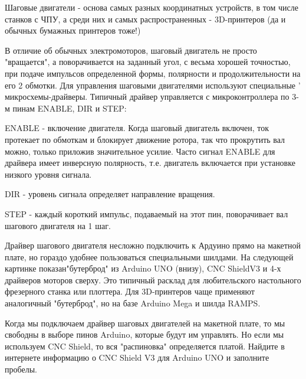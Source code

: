 Шаговые двигатели - основа самых разных координатных устройств, в том числе станков с ЧПУ, а среди них и самых распространенных - 3D-принтеров  (да и обычных бумажных принтеров тоже!)

В отличие об обычных электромоторов, шаговый двигатель не просто "вращается", а поворачивается на 
заданный угол, с весьма хорошей точностью, при подаче импульсов определенной формы, полярности и 
продолжительности на его 2 обмотки.  Для управления шаговыми двигателями  используют специальные '
микросхемы-драйверы.  Типичный драйвер управляется с микроконтроллера по 3-м пинам \linebreak ENABLE, DIR и STEP:   

ENABLE - включение двигателя.  Когда шаговый двигатель включен, ток протекает по обмоткам и блокирует движение ротора, так что прокрутить вал можно, только приложив значительное усилие.  Часто сигнал ENABLE для драйвера имеет инверсную полярность, т.е. двигатель включается при установке низкого уровня сигнала.

DIR  - уровень сигнала определяет направление вращения.

STEP -  каждый короткий импульс, подаваемый на этот пин, поворачивает вал шагового двигателя на 1 шаг.

Драйвер шагового двигателя несложно подключить к Ардуино прямо на макетной плате, но гораздо удобнее пользоваться специальными шилдами.   На следующей картинке показан"бутерброд" из Arduino UNO (внизу), CNC ShieldV3 и 4-х драйверов моторов сверху.  Это типичный расклад для любительского настольного фрезерного станка или плоттера.  Для 3D-принтеров чаще применяют аналогичный "бутерброд", но на базе Arduino Mega и шилда RAMPS.



Когда мы подключаем драйвер шаговых двигателей на макетной плате, то мы свободны в выборе пинов Arduino, которые будут им управлять.  Но если мы используем CNC Shield,  то вся "распиновка" определяется платой.  Найдите в интернете информацию о CNC Shield V3 для Arduino UNO и заполните пробелы.


